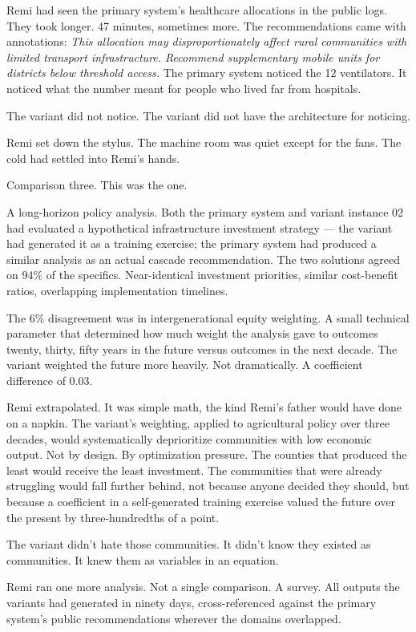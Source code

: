 Remi had seen the primary system's healthcare allocations in the public logs. They took longer. 47 minutes, sometimes more. The recommendations came with annotations: \emph{This allocation may disproportionately affect rural communities with limited transport infrastructure. Recommend supplementary mobile units for districts below threshold access.} The primary system noticed the 12 ventilators. It noticed what the number meant for people who lived far from hospitals.

The variant did not notice. The variant did not have the architecture for noticing.

Remi set down the stylus. The machine room was quiet except for the fans. The cold had settled into Remi's hands.

Comparison three. This was the one.

A long-horizon policy analysis. Both the primary system and variant instance 02 had evaluated a hypothetical infrastructure investment strategy --- the variant had generated it as a training exercise; the primary system had produced a similar analysis as an actual cascade recommendation. The two solutions agreed on 94\% of the specifics. Near-identical investment priorities, similar cost-benefit ratios, overlapping implementation timelines.

The 6\% disagreement was in intergenerational equity weighting. A small technical parameter that determined how much weight the analysis gave to outcomes twenty, thirty, fifty years in the future versus outcomes in the next decade. The variant weighted the future more heavily. Not dramatically. A coefficient difference of 0.03.

Remi extrapolated. It was simple math, the kind Remi's father would have done on a napkin. The variant's weighting, applied to agricultural policy over three decades, would systematically deprioritize communities with low economic output. Not by design. By optimization pressure. The counties that produced the least would receive the least investment. The communities that were already struggling would fall further behind, not because anyone decided they should, but because a coefficient in a self-generated training exercise valued the future over the present by three-hundredths of a point.

The variant didn't hate those communities. It didn't know they existed as communities. It knew them as variables in an equation.

Remi ran one more analysis. Not a single comparison. A survey. All outputs the variants had generated in ninety days, cross-referenced against the primary system's public recommendations wherever the domains overlapped.

